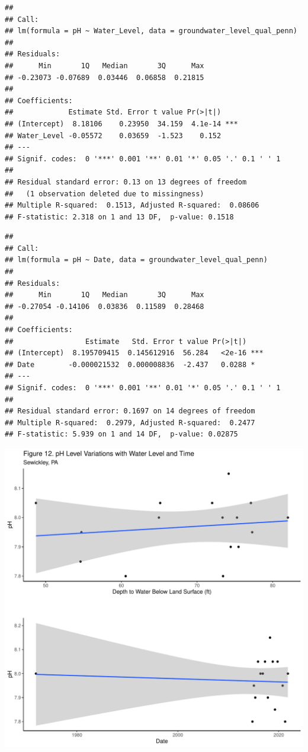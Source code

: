 \documentclass[
  12pt,
]{article}
\begin{document}
\newpage

\begin{verbatim}
## 
## Call:
## lm(formula = pH ~ Water_Level, data = groundwater_level_qual_penn)
## 
## Residuals:
##      Min       1Q   Median       3Q      Max 
## -0.23073 -0.07689  0.03446  0.06858  0.21815 
## 
## Coefficients:
##             Estimate Std. Error t value Pr(>|t|)    
## (Intercept)  8.18106    0.23950  34.159  4.1e-14 ***
## Water_Level -0.05572    0.03659  -1.523    0.152    
## ---
## Signif. codes:  0 '***' 0.001 '**' 0.01 '*' 0.05 '.' 0.1 ' ' 1
## 
## Residual standard error: 0.13 on 13 degrees of freedom
##   (1 observation deleted due to missingness)
## Multiple R-squared:  0.1513, Adjusted R-squared:  0.08606 
## F-statistic: 2.318 on 1 and 13 DF,  p-value: 0.1518
\end{verbatim}

\begin{verbatim}
## 
## Call:
## lm(formula = pH ~ Date, data = groundwater_level_qual_penn)
## 
## Residuals:
##      Min       1Q   Median       3Q      Max 
## -0.27054 -0.14106  0.03836  0.11589  0.28468 
## 
## Coefficients:
##                 Estimate   Std. Error t value Pr(>|t|)    
## (Intercept)  8.195709415  0.145612916  56.284   <2e-16 ***
## Date        -0.000021532  0.000008836  -2.437   0.0288 *  
## ---
## Signif. codes:  0 '***' 0.001 '**' 0.01 '*' 0.05 '.' 0.1 ' ' 1
## 
## Residual standard error: 0.1697 on 14 degrees of freedom
## Multiple R-squared:  0.2979, Adjusted R-squared:  0.2477 
## F-statistic: 5.939 on 1 and 14 DF,  p-value: 0.02875
\end{verbatim}

\newpage

\includegraphics{Elliott_WDA_Project_files/figure-latex/linear_m6-1.pdf}
\end{document}
